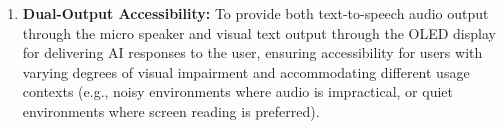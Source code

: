 \begin{enumerate}[leftmargin=1.5cm]
\item \textbf{Dual-Output Accessibility:} To provide both text-to-speech audio output through the micro speaker and visual text output through the OLED display for delivering AI responses to the user, ensuring accessibility for users with varying degrees of visual impairment and accommodating different usage contexts (e.g., noisy environments where audio is impractical, or quiet environments where screen reading is preferred).
\end{enumerate}
